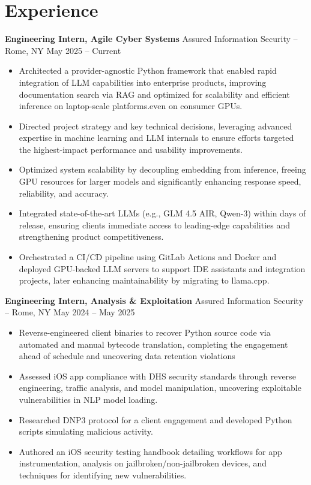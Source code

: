 \documentclass[11pt]{article}       %
\begin{document}
	\section*{Experience}
	\textbf{Engineering Intern, Agile Cyber Systems} {Assured Information Security} -- Rome, NY \hfill May 2025 -- Current \\
	\vspace{-8pt}
	\begin{itemize}
		\item Architected a provider-agnostic Python framework that enabled rapid integration of LLM capabilities into enterprise products, improving documentation search via RAG and optimized for scalability and efficient inference on laptop-scale platforms.even on consumer GPUs.
		\item Directed project strategy and key technical decisions, leveraging advanced expertise in machine learning and LLM internals to ensure efforts targeted the highest-impact performance and usability improvements.
		\item Optimized system scalability by decoupling embedding from inference, freeing GPU resources for larger models and significantly enhancing response speed, reliability, and accuracy.
		\item Integrated state-of-the-art LLMs (e.g., GLM 4.5 AIR, Qwen-3) within days of release, ensuring clients immediate access to leading-edge capabilities and strengthening product competitiveness.
		\item Orchestrated a CI/CD pipeline using GitLab Actions and Docker and deployed GPU-backed LLM servers to support IDE assistants and integration projects, later enhancing maintainability by migrating to llama.cpp.
	\end{itemize}
	\vspace{-8pt}
	\textbf{Engineering Intern, Analysis \& Exploitation} {Assured Information Security} -- Rome, NY \hfill May 2024 -- May 2025 \\
	\vspace{-8pt}
	\begin{itemize}
		\item Reverse-engineered client binaries to recover Python source code via automated and manual bytecode translation, completing the engagement ahead of schedule and uncovering data retention violations
		\item Assessed iOS app compliance with DHS security standards through reverse engineering, traffic analysis, and model manipulation, uncovering exploitable vulnerabilities in NLP model loading.
		\item Researched DNP3 protocol for a client engagement and developed Python scripts simulating malicious activity.
		\item Authored an iOS security testing handbook detailing workflows for app instrumentation, analysis on jailbroken/non-jailbroken devices, and techniques for identifying new vulnerabilities.
	\end{itemize}
	
\end{document}
